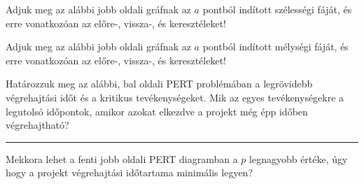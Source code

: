 \documentclass[a4paper,12pt]{article}
\begin{document}
    \noindent{}
    \noindent{}
    \begin{enumerate}


        \begin{minipage}{0.65\textwidth}
            \item Adjuk meg az alábbi jobb oldali gráfnak az $a$ pontból indított szélességi fáját, és erre vonatkozóan az előre-, vissza-, és keresztéleket!
            \item Adjuk meg az alábbi jobb oldali gráfnak az $a$ pontból indított mélységi fáját, és erre vonatkozóan az előre-, vissza-, és keresztéleket!
        \end{minipage}
        \begin{minipage}{0.25\textwidth}
            \centering
                
        \end{minipage}

        \item Határozzuk meg az alábbi, bal oldali PERT problémában a legrövidebb végrehajtási időt és a kritikus tevékenységeket. Mik az egyes tevékenységekre a legutolsó időpontok, amikor azokat elkezdve a projekt még épp időben végrehajtható?
        \begin{figure}[!h]
            \centering
             \hspace{2cm}
            
        \end{figure}

        \hrule

        \item Mekkora lehet a fenti jobb oldali PERT diagramban a $p$ legnagyobb értéke, úgy hogy a projekt végrehajtási időtartama minimális legyen?
        

\end{enumerate}
\end{document}
